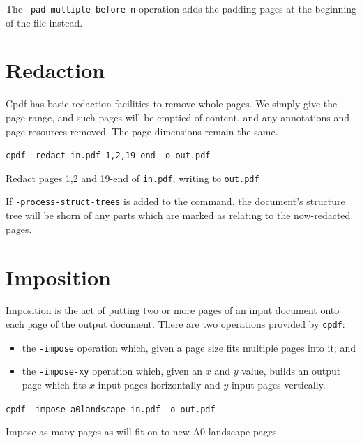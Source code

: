 \documentclass{book}
\begin{document}
\noindent The \texttt{-pad-multiple-before n} operation adds the padding pages at the beginning of the file  instead.

\section{Redaction}

Cpdf has basic redaction facilities to remove whole pages. We simply give the page range, and such pages will be emptied of content, and any annotations and page resources removed. The page dimensions remain the same.

  \begin{framed}
    \noindent\small\verb!cpdf -redact in.pdf 1,2,19-end -o out.pdf!
 
    \vspace{2.5mm}
    \noindent Redact pages 1,2 and 19-end of \texttt{in.pdf}, writing to \texttt{out.pdf}
  \end{framed}

\noindent If \texttt{-process-struct-trees} is added to the command, the document's structure tree will be shorn of any parts which are marked as relating to the now-redacted pages.

\section{Imposition}


Imposition is the act of putting two or more pages of an input document onto each page of the output document. There are two operations provided by \texttt{cpdf}:

\begin{itemize}
\item the \texttt{-impose} operation which, given a page size fits multiple pages into it; and
\item the \texttt{-impose-xy} operation which, given an $x$ and $y$ value, builds an output page which fits $x$ input pages horizontally and $y$ input pages vertically. \end{itemize}

  \begin{framed}
    \noindent\small\verb!cpdf -impose a0landscape in.pdf -o out.pdf!
 
    \vspace{2.5mm}
    \noindent Impose as many pages as will fit on to new A0 landscape pages. 
  \end{framed}
\end{document}
